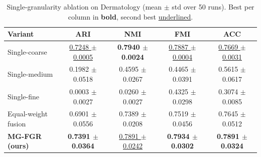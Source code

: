 \begin{table}[!htbp]
\footnotesize
  \centering
  \caption{Single-granularity ablation on Dermatology (mean $\pm$ std over 50 runs). Best per column in \textbf{bold}, second best \underline{underlined}.}
  \label{tab:ablation}
  \begin{tabular}{lcccc}
    \toprule
    \textbf{Variant} & \textbf{ARI} & \textbf{NMI} & \textbf{FMI} & \textbf{ACC} \\
    \midrule
    Single-coarse & \underline{0.7248 $\pm$ 0.0005} & \textbf{0.7940 $\pm$ 0.0024} & \underline{0.7887 $\pm$ 0.0004} & \underline{0.7669 $\pm$ 0.0031} \\
    Single-medium & 0.1982 $\pm$ 0.0518 & 0.4595 $\pm$ 0.0267 & 0.4465 $\pm$ 0.0391 & 0.5615 $\pm$ 0.0617 \\
    Single-fine & 0.0003 $\pm$ 0.0027 & 0.0260 $\pm$ 0.0027 & 0.4325 $\pm$ 0.0298 & 0.3074 $\pm$ 0.0085 \\
    Equal-weight fusion & 0.6901 $\pm$ 0.0556 & 0.7389 $\pm$ 0.0208 & 0.7519 $\pm$ 0.0456 & 0.7645 $\pm$ 0.0512 \\
    \textbf{MG-FGR (ours)} & \textbf{0.7391 $\pm$ 0.0364} & \underline{0.7891 $\pm$ 0.0242} & \textbf{0.7934 $\pm$ 0.0302} & \textbf{0.7891 $\pm$ 0.0324} \\
    \bottomrule
  \end{tabular}
\end{table}